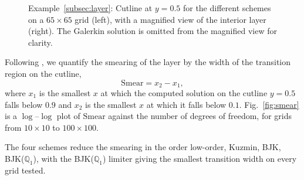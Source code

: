 \documentclass[a4paper]{article}
\theoremstyle{plain}
\theoremstyle{definition}
\theoremstyle{remark}
\begin{document}
\begin{figure}[tbp]
\begin{minipage}[t]{0.48\textwidth}
\end{minipage}

	\caption{Example~\ref{subsec:layer}: Cutline at $y=0.5$ for the different schemes on a
	$65\times65$ grid (left), with a magnified view of the interior layer (right).
	The Galerkin solution is omitted from the magnified view for clarity.}
	\label{fig:cutline}
\end{figure}

Following \cite{JJK24}, we quantify the smearing of the layer by the width of the
transition region on the cutline,
\begin{equation}
	\mathrm{Smear} = x_2 - x_1,
	\label{eq:smear}
\end{equation}
where $x_1$ is the smallest $x$ at which the computed solution on the cutline
$y = 0.5$ falls below $0.9$ and $x_2$ is the smallest $x$ at which it falls below
$0.1$. Fig.~\ref{fig:smear} is a $\log$--$\log$ plot of $\mathrm{Smear}$ against the
number of degrees of freedom, for grids from $10 \times 10$ to $100 \times 100$.

The four schemes reduce the smearing in the order low-order, Kuzmin, BJK, BJK($ \mathbb{Q}_1 $), with the
BJK($ \mathbb{Q}_1 $) limiter giving the smallest transition width on every grid tested.
\end{document}
